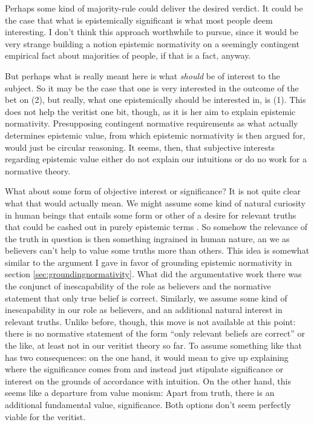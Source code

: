 \documentclass[12pt,numbers=noenddot]{scrartcl}
\begin{document}
Perhaps some kind of majority-rule could deliver the desired verdict. It could be the case that what is epistemically significant is what most people deem interesting. I don't think this approach worthwhile to pursue, since it would be very strange building a notion epistemic normativity on a seemingly contingent empirical fact about majorities of people, if that is a fact, anyway.

But perhaps what is really meant here is what \emph{should} be of interest to the subject. So it may be the case that one is very interested in the outcome of the bet on (2), but really, what one epistemically should be interested in, is (1). This does not help the veritist one bit, though, as it is her aim to explain epistemic normativity. Presupposing contingent normative requirements as what actually determines epistemic value, from which epistemic normativity is then argued for, would just be circular reasoning. It seems, then, that subjective interests regarding epistemic value either do not explain our intuitions or do no work for a normative theory.

What about some form of objective interest or significance? It is not quite clear what that would actually mean. We might assume some kind of natural curiosity in human beings that entails some form or other of a desire for relevant truths that could be cashed out in purely epistemic terms \autocite[333]{Ahlstrom-Vij2013}. So somehow the relevance of the truth in question is then something ingrained in human nature, an we as believers can't help to value some truths more than others. This idea is somewhat similar to the argument I gave in favor of grounding epistemic normativity in section \ref{sec:groundingnormativity}. What did the argumentative work there was the conjunct of inescapability of the role as believers and the normative statement that only true belief is correct. Similarly, we assume some kind of inescapability in our role as believers, and an additional natural interest in relevant truths. Unlike before, though, this move is not available at this point: there is no normative statement of the form “only relevant beliefs are correct” or the like, at least not in our veritist theory so far. To assume something like that has two consequences: on the one hand, it would mean to give up explaining where the significance comes from and instead just stipulate significance or interest on the grounds of accordance with intuition. On the other hand, this seems like a departure from value monism: Apart from truth, there is an additional fundamental value, significance. Both options don't seem perfectly viable for the veritist.
\end{document}
